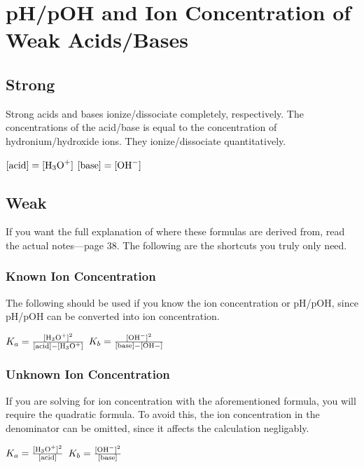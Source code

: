 \documentclass[a4paper,12pt]{article}
\begin{document}
\section{pH/pOH and Ion Concentration of Weak Acids/Bases}
\subsection{Strong}
Strong acids and bases ionize/dissociate completely, respectively. The concentrations of the acid/base is equal to the concentration of hydronium/hydroxide ions. They ionize/dissociate quantitatively.

\begin{center}
    $[\textrm{acid}] = [\ce{H3O+}]$ \hspace{1in} $[\textrm{base}] = [\ce{OH-}]$
\end{center}

\subsection{Weak}
If you want the full explanation of where these formulas are derived from, read the actual notes---page 38. The following are the shortcuts you truly only need.

\subsubsection{Known Ion Concentration}
The following should be used if you know the ion concentration or pH/pOH, since pH/pOH can be converted into ion concentration.

\begin{center}
\Large
$K_a = \frac{[\ce{H3O+}]^2}{[\textrm{acid}] - [\ce{H3O+]}}$
\hspace{0.5in}
$K_b = \frac{[\ce{OH-}]^2}{[\textrm{base}] - [\ce{OH-]}}$
\normalsize
\end{center}

\subsubsection{Unknown Ion Concentration}
If you are solving for ion concentration with the aforementioned formula, you will require the quadratic formula. To avoid this, the ion concentration in the denominator can be omitted, since it affects the calculation negligably.

\begin{center}
\Large
$K_a = \frac{[\ce{H3O+}]^2}{[\textrm{acid}]}$
\hspace{0.5in}
$K_b = \frac{[\ce{OH-}]^2}{[\textrm{base}]}$
\normalsize
\end{center}
\end{document}
